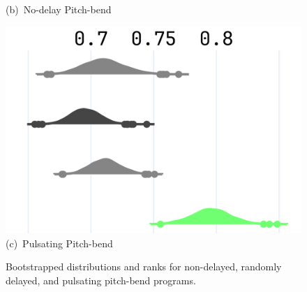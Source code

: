 \begin{figure}[t]
\begin{minipage}[t]{0.94\textwidth}
\begin{minipage}[t]{0.31\textwidth}
      \vspace{0.3em}
      \footnotesize (b)~No-delay Pitch-bend
    \end{minipage}
    \hspace{0.015\textwidth}
    \begin{minipage}[t]{0.31\textwidth}
      \centering
      \includegraphics[width=\linewidth]{images/npsk_ood_P_Loss_5.png}
      \vspace{0.3em}
      \footnotesize (c)~Pulsating Pitch-bend
    \end{minipage}
  \end{minipage}
  \caption{Bootstrapped distributions and ranks for non-delayed, randomly delayed, and pulsating pitch-bend programs.}
  \label{fig:npsk_pitch_bends}
\end{figure}
